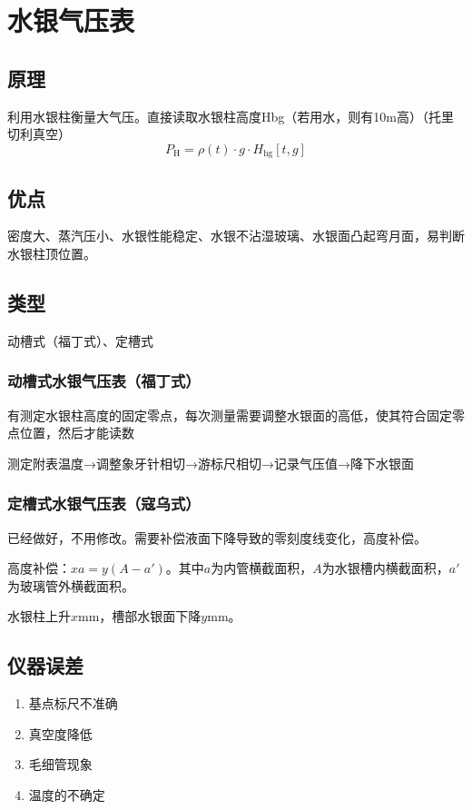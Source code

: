 \documentclass[UTF8,11pt]{ctexbook}
\begin{document}
\section{水银气压表}

\subsection{原理}

利用水银柱衡量大气压。直接读取水银柱高度Hbg（若用水，则有10m高）（托里切利真空）
\[
P_\mathrm{H}=\rho(t)\cdot g\cdot H_\mathrm{hg}[t,g]
\]

\subsection{优点}

密度大、蒸汽压小、水银性能稳定、水银不沾湿玻璃、水银面凸起弯月面，易判断水银柱顶位置。

\subsection{类型}

动槽式（福丁式）、定槽式

\subsubsection{动槽式水银气压表（福丁式）}

有测定水银柱高度的固定零点，每次测量需要调整水银面的高低，使其符合固定零点位置，然后才能读数

测定附表温度→调整象牙针相切→游标尺相切→记录气压值→降下水银面

\subsubsection{定槽式水银气压表（寇乌式）}

已经做好，不用修改。需要补偿液面下降导致的零刻度线变化，高度补偿。

高度补偿：\(xa=y(A-a')\)。其中\(a\)为内管横截面积，\(A\)为水银槽内横截面积，\(a'\)为玻璃管外横截面积。

水银柱上升\(x\mathrm{mm}\)，槽部水银面下降\(y\mathrm{mm}\)。

\subsection{仪器误差}
\begin{enumerate}
    \item 基点标尺不准确
    \item 真空度降低
    \item 毛细管现象
    \item 温度的不确定
\end{enumerate}
\end{document}
